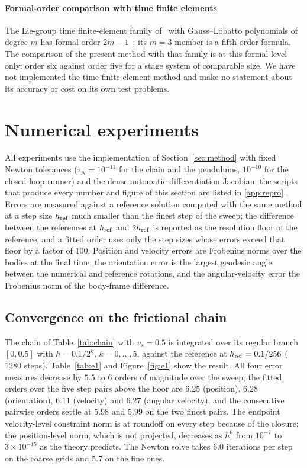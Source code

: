 \documentclass[preprint,12pt]{elsarticle}
\begin{document}
\paragraph{Formal-order comparison with time finite elements}
The Lie-group time finite-element family of~\cite{chaturvedi2026tfe} with Gauss--Lobatto
polynomials of degree $m$ has formal order $2m-1$~\cite{kim2017higher}; its $m=3$ member is a
fifth-order formula. The comparison of the present method with that family is at this formal level
only: order six against order five for a stage system of comparable size. We have not implemented
the time finite-element method and make no statement about its accuracy or cost on its own test
problems.

\section{Numerical experiments}
\label{sec:numerical}

All experiments use the implementation of Section~\ref{sec:method} with fixed Newton tolerances
($\tau_N=10^{-11}$ for the chain and the pendulums, $10^{-10}$ for the closed-loop runner) and the
dense automatic-differentiation Jacobian; the scripts that produce every
number and figure of this section are listed in \ref{app:repro}. Errors are measured
against a reference solution computed with the same method at a step size $h_{\rm ref}$ much
smaller than the finest step of the sweep; the difference between the references at $h_{\rm ref}$
and $2h_{\rm ref}$ is reported as the resolution floor of the reference, and a fitted order uses only
the step sizes whose errors exceed that floor by a factor of $100$. Position and velocity errors are
Frobenius norms over the bodies at the final time; the orientation error is the largest geodesic
angle between the numerical and reference rotations, and the angular-velocity error the Frobenius
norm of the body-frame difference.

\subsection{Convergence on the frictional chain}
\label{sec:e1}

The chain of Table~\ref{tab:chain} with $v_s=0.5$ is integrated over its regular branch $[0,0.5]$
with $h=0.1/2^k$, $k=0,\dots,5$, against the reference at $h_{\rm ref}=0.1/256$ ($1280$ steps).
Table~\ref{tab:e1} and Figure~\ref{fig:e1} show the result. All four error measures decrease by
$5.5$ to $6$ orders of magnitude over the sweep; the fitted orders over the five step pairs above
the floor are $6.25$ (position), $6.28$ (orientation), $6.11$ (velocity) and $6.27$ (angular
velocity), and the consecutive pairwise orders settle at $5.98$ and $5.99$ on the two finest
pairs. The endpoint velocity-level constraint norm is at roundoff on every step because of the
closure; the position-level norm, which is not projected, decreases as $h^6$ from $10^{-7}$ to
$3\times10^{-15}$ as the theory predicts. The Newton solve takes $6.0$ iterations per step on the
coarse grids and $5.7$ on the fine ones.
\end{document}
